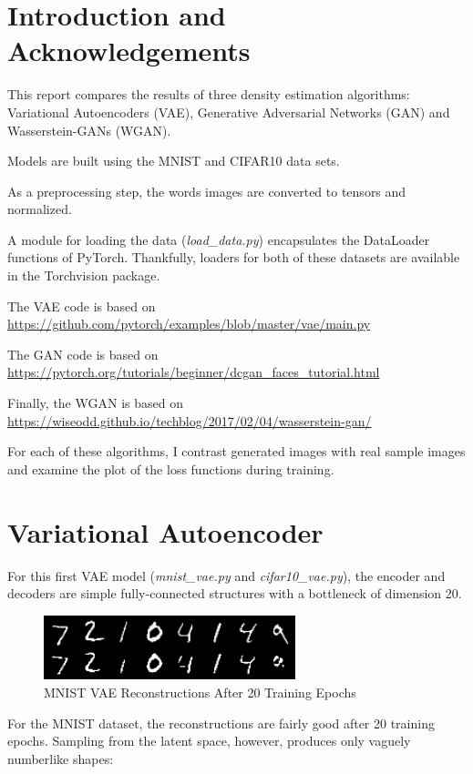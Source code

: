 \documentclass[letterpaper, 10pt]{article}
\begin{document}
\section{Introduction and Acknowledgements}

This report compares the results of three density estimation algorithms:
Variational Autoencoders (VAE), Generative Adversarial Networks (GAN) and Wasserstein-GANs (WGAN).

Models are built using the MNIST and CIFAR10 data sets.

As a preprocessing step, the words images are converted to tensors and normalized.

A module for loading the data ({\em load\_data.py}) encapsulates the DataLoader functions of PyTorch.
Thankfully, loaders for both of these datasets are available in the Torchvision package.

The VAE code is based on \url{https://github.com/pytorch/examples/blob/master/vae/main.py}

The GAN code is based on \url{https://pytorch.org/tutorials/beginner/dcgan_faces_tutorial.html}

Finally, the WGAN is based on \url{https://wiseodd.github.io/techblog/2017/02/04/wasserstein-gan/}

For each of these algorithms, I contrast generated images with real sample images and examine the plot of the loss functions during training.

\section{Variational Autoencoder}

For this first VAE model ({\em mnist\_vae.py} and {\em cifar10\_vae.py}), the
encoder and decoders are simple fully-connected structures with a bottleneck of dimension 20.

\begin{figure}[h]
 \caption{MNIST VAE Reconstructions After 20 Training Epochs}
 \centering
 \includegraphics[width=0.65\textwidth]{mnist_vae_reconstruction_20epochs}
\end{figure}

For the MNIST dataset, the reconstructions are fairly good after 20 training epochs.
Sampling from the latent space, however, produces only vaguely numberlike shapes:
\end{document}

